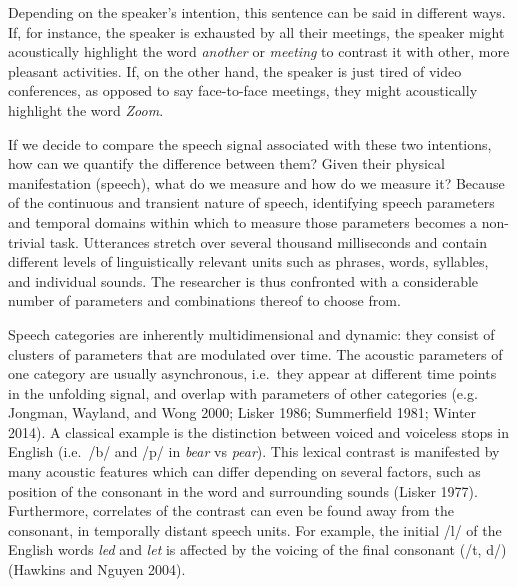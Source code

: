 \documentclass[
  12pt,
]{article}
\begin{document}
Depending on the speaker's intention, this sentence can be said in different ways.
If, for instance, the speaker is exhausted by all their meetings, the speaker might acoustically highlight the word \emph{another} or \emph{meeting} to contrast it with other, more pleasant activities.
If, on the other hand, the speaker is just tired of video conferences, as opposed to say face-to-face meetings, they might acoustically highlight the word \emph{Zoom}.

If we decide to compare the speech signal associated with these two intentions, how can we quantify the difference between them?
Given their physical manifestation (speech), what do we measure and how do we measure it?
Because of the continuous and transient nature of speech, identifying speech parameters and temporal domains within which to measure those parameters becomes a non-trivial task.
Utterances stretch over several thousand milliseconds and contain different levels of linguistically relevant units such as phrases, words, syllables, and individual sounds.
The researcher is thus confronted with a considerable number of parameters and combinations thereof to choose from.

Speech categories are inherently multidimensional and dynamic: they consist of clusters of parameters that are modulated over time.
The acoustic parameters of one category are usually asynchronous, i.e.~they appear at different time points in the unfolding signal, and overlap with parameters of other categories (e.g. Jongman, Wayland, and Wong 2000; Lisker 1986; Summerfield 1981; Winter 2014).
A classical example is the distinction between voiced and voiceless stops in English (i.e.~/b/ and /p/ in \emph{bear} vs \emph{pear}).
This lexical contrast is manifested by many acoustic features which can differ depending on several factors, such as position of the consonant in the word and surrounding sounds (Lisker 1977).
Furthermore, correlates of the contrast can even be found away from the consonant, in temporally distant speech units.
For example, the initial /l/ of the English words \emph{led} and \emph{let} is affected by the voicing of the final consonant (/t, d/) (Hawkins and Nguyen 2004).
\end{document}
